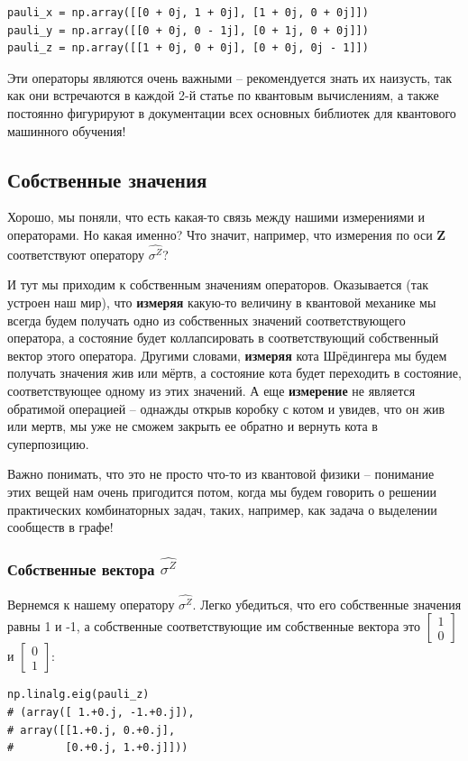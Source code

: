 \documentclass[11pt]{article}
\begin{document}
\begin{verbatim}
pauli_x = np.array([[0 + 0j, 1 + 0j], [1 + 0j, 0 + 0j]])
pauli_y = np.array([[0 + 0j, 0 - 1j], [0 + 1j, 0 + 0j]])
pauli_z = np.array([[1 + 0j, 0 + 0j], [0 + 0j, 0j - 1]])
\end{verbatim}

Эти операторы являются очень важными -- рекомендуется знать их наизусть, так как они встречаются в каждой 2-й статье по квантовым вычислениям, а также постоянно фигурируют в документации всех основных библиотек для квантового машинного обучения!

\subsection{Собственные значения}
\label{sec:orga95b258}
Хорошо, мы поняли, что есть какая-то связь между нашими измерениями и операторами. Но какая именно? Что значит, например, что измерения по оси \(\mathbf{Z}\) соответствуют оператору \(\hat{\sigma^Z}\)?

И тут мы приходим к собственным значениям операторов. Оказывается (так устроен наш мир), что \textbf{измеряя} какую-то величину в квантовой механике мы всегда будем получать одно из собственных значений соответствующего оператора, а состояние будет коллапсировать в соответствующий собственный вектор этого оператора. Другими словами, \textbf{измеряя} кота Шрёдингера мы будем получать значения жив или мёртв, а состояние кота будет переходить в состояние, соответствующее одному из этих значений. А еще \textbf{измерение} не является обратимой операцией -- однажды открыв коробку с котом и увидев, что он жив или мертв, мы уже не сможем закрыть ее обратно и вернуть кота в суперпозицию.

Важно понимать, что это не просто что-то из квантовой физики -- понимание этих вещей нам очень пригодится потом, когда мы будем говорить о решении практических комбинаторных задач, таких, например, как задача о выделении сообществ в графе!

\subsubsection{Собственные вектора \(\hat{\sigma^Z}\)}
\label{sec:org4069709}
Вернемся к нашему оператору \(\hat{\sigma^Z}\). Легко убедиться, что его собственные значения равны 1 и -1, а собственные соответствующие им собственные вектора это \(\begin{bmatrix}1 \\ 0\end{bmatrix}\) и \(\begin{bmatrix}0 \\ 1\end{bmatrix}\):
\begin{verbatim}
np.linalg.eig(pauli_z)
# (array([ 1.+0.j, -1.+0.j]),
# array([[1.+0.j, 0.+0.j],
#        [0.+0.j, 1.+0.j]]))
\end{verbatim}
\end{document}
